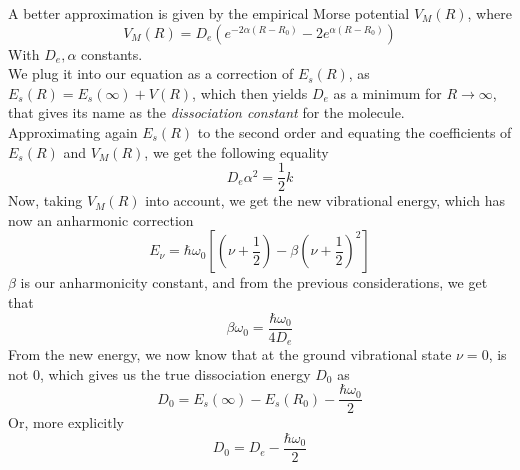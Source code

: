 \documentclass[../qm.tex]{subfiles}
\begin{document}
	A better approximation is given by the empirical Morse potential $V_M(R)$, where
	\begin{equation*}
		V_M(R)=D_e\left( e^{-2\alpha(R-R_0)}-2e^{\alpha(R-R_0)} \right)
	\end{equation*}
	With $D_e,\alpha$ constants.\\
	We plug it into our equation as a correction of $E_s(R)$, as $E_s(R)=E_s(\infty)+V(R)$, which then yields $D_e$ as a minimum for $R\to\infty$, that gives its name as the \textit{dissociation constant} for the molecule.\\
	Approximating again $E_s(R)$ to the second order and equating the coefficients of $E_s(R)$ and $V_M(R)$, we get the following equality
	\begin{equation}
		D_e\alpha^2=\frac{1}{2}k
		\label{eq:morseesequality}
	\end{equation}
	Now, taking $V_M(R)$ into account, we get the new vibrational energy, which has now an anharmonic correction
	\begin{equation}
		E_\nu=\hbar\omega_0\left[ \left( \nu+\frac{1}{2} \right)-\beta\left( \nu+\frac{1}{2} \right)^2 \right]
		\label{eq:newvibrationalenergy}
	\end{equation}
	$\beta$ is our anharmonicity constant, and from the previous considerations, we get that
	\begin{equation*}
		\beta\omega_0=\frac{\hbar\omega_0}{4D_e}
	\end{equation*}
	From the new energy, we now know that at the ground vibrational state $\nu=0$, is not $0$, which gives us the true dissociation energy $D_0$ as
	\begin{equation*}
		D_0=E_s(\infty)-E_s(R_0)-\frac{\hbar\omega_0}{2}
	\end{equation*}
	Or, more explicitly
	\begin{equation}
		D_0=D_e-\frac{\hbar\omega_0}{2}
		\label{eq:dissociationenergymolecule}
	\end{equation}
\end{document}

